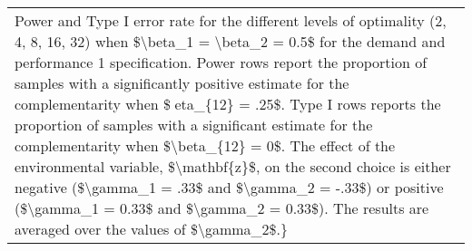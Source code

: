 \begin{table}
\begin{tabular}[t]{lrrrrrrrrrrrrr}
\multicolumn{14}{l}{Power and Type I error rate for the different levels of optimality (2, 4, 8, 16, 32) when \$\textbackslash{}beta\_1 = \textbackslash{}beta\_2 = 0.5\$ for the demand and performance 1 specification. Power rows report the proportion of samples with a significantly positive estimate for the complementarity when \$eta\_\{12\} = .25\$. Type I rows reports the proportion of samples with a significant estimate for the complementarity when \$\textbackslash{}beta\_\{12\} = 0\$. The effect of the environmental variable, \$\textbackslash{}mathbf\{z\}\$, on the second choice is either negative (\$\textbackslash{}gamma\_1 = .33\$ and \$\textbackslash{}gamma\_2 = -.33\$) or positive (\$\textbackslash{}gamma\_1 = 0.33\$ and \$\textbackslash{}gamma\_2 = 0.33\$). The results are averaged over the values of \$\textbackslash{}gamma\_2\$.\}}\\
\end{tabular}
\end{table}